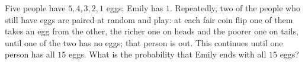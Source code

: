 Five people have $5,4,3,2,1$ eggs; Emily has $1$. Repeatedly, two of the people who still have eggs are paired at random and play: at each fair coin flip one of them takes an egg from the other, the richer one on heads and the poorer one on tails, until one of the two has no eggs; that person is out. This continues until one person has all $15$ eggs. What is the probability that Emily ends with all $15$ eggs?
